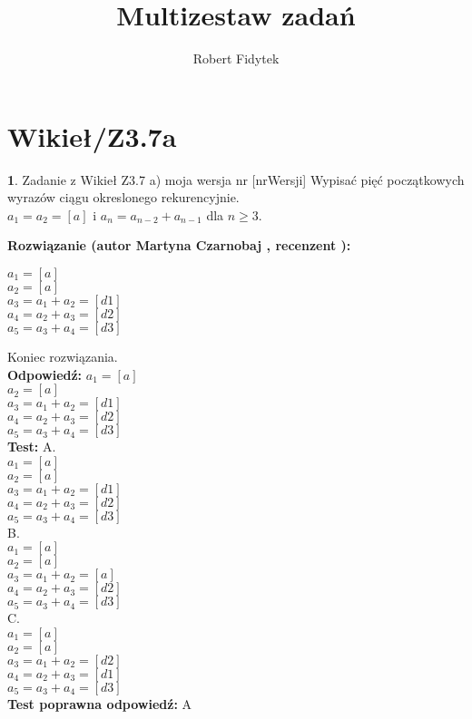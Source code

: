 \documentclass[12pt, a4paper]{article}
\title{Multizestaw zadań}
\author{Robert Fidytek}
\date{}
\theoremstyle{definition} %
\newtheorem{zad}{}
\newcommand{\kategoria}[1]{\section{#1}} %
\newcommand{\zadStart}[1]{\begin{zad}#1\newline} %
\newcommand{\zadStop}{\end{zad}}   %
\newcommand{\rozwStart}[2]{\noindent \textbf{Rozwiązanie (autor #1 , recenzent #2): }\newline} %
\newcommand{\rozwStop}{\newline}                                            %
\newcommand{\odpStart}{\noindent \textbf{Odpowiedź:}\newline}    %
\newcommand{\odpStop}{\newline}                                             %
\newcommand{\testStart}{\noindent \textbf{Test:}\newline} %
\newcommand{\testStop}{\newline} %
\newcommand{\kluczStart}{\noindent \textbf{Test poprawna odpowiedź:}\newline} %
\newcommand{\kluczStop}{\newline} %
\begin{document}
\maketitle


\kategoria{Wikieł/Z3.7a}
\zadStart{Zadanie z Wikieł Z3.7 a) moja wersja nr [nrWersji]}
Wypisać pięć początkowych wyrazów ciągu okreslonego rekurencyjnie.\\
$ a_{1} = a_{2} = [a] $ i $ a_{n} = a_{n-2} + a_{n-1} $ dla $ n \geq 3 $.\\
\zadStop
\rozwStart{Martyna Czarnobaj}{}
\begin{center}
	$ a_{1} = [a] $\\
	$ a_{2} = [a] $\\
	$ a_{3} = a_{1} + a_{2} = [d1] $\\
	$ a_{4} = a_{2} + a_{3} = [d2] $\\
	$ a_{5} = a_{3} + a_{4} = [d3] $\\
\end{center}

Koniec rozwiązania.\\
\rozwStop
\odpStart
$ a_{1} = [a] $\\
$ a_{2} = [a] $\\
$ a_{3} = a_{1} + a_{2} = [d1] $\\
$ a_{4} = a_{2} + a_{3} = [d2] $\\
$ a_{5} = a_{3} + a_{4} = [d3] $\\
\odpStop
\testStart
A.\\
$ a_{1} = [a] $\\
$ a_{2} = [a] $\\
$ a_{3} = a_{1} + a_{2} = [d1] $\\
$ a_{4} = a_{2} + a_{3} = [d2] $\\
$ a_{5} = a_{3} + a_{4} = [d3] $\\
B.\\
$ a_{1} = [a] $\\
$ a_{2} = [a] $\\
$ a_{3} = a_{1} + a_{2} = [a] $\\
$ a_{4} = a_{2} + a_{3} = [d2] $\\
$ a_{5} = a_{3} + a_{4} = [d3] $\\
C.\\
$ a_{1} = [a] $\\
$ a_{2} = [a] $\\
$ a_{3} = a_{1} + a_{2} = [d2] $\\
$ a_{4} = a_{2} + a_{3} = [d1] $\\
$ a_{5} = a_{3} + a_{4} = [d3] $\\
\testStop
\kluczStart
A
\kluczStop
\end{document}
